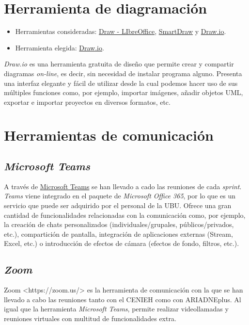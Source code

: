 \section{Herramienta de diagramación}

\begin{itemize}
\tightlist
\item
  Herramientas consideradas:
  \href{https://es.libreoffice.org/descubre/draw/}{Draw - LIbreOffice},
  \href{https://www.smartdraw.com/}{SmartDraw} y
  \href{https://app.diagrams.net/}{Draw.io}.
\item
  Herramienta elegida: \href{https://app.diagrams.net/}{Draw.io}.
\end{itemize}

\emph{Draw.io} es una herramienta gratuita de diseño que permite crear y
compartir diagramas \emph{on-line}, es decir, sin necesidad de instalar
programa alguno. Presenta una interfaz elegante y fácil de utilizar
desde la cual podemos hacer uso de sus múltiples funciones como, por
ejemplo, importar imágenes, añadir objetos UML, exportar e importar
proyectos en diversos formatos, etc.

\section{Herramientas de comunicación}

\subsection{\emph{Microsoft Teams}}

A través de
\href{https://www.microsoft.com/es-es/education/products/teams}{Microsoft
Teams} se han llevado a cado las reuniones de cada \emph{sprint}.
\emph{Teams} viene integrado en el paquete de \emph{Microsoft Office
365}, por lo que es un servicio que puede ser adquirido por el personal
de la UBU. Ofrece una gran cantidad de funcionalidades relacionadas con
la comunicación como, por ejemplo, la creación de chats personalizados
(individuales/grupales, públicos/privados, etc.), compartición de
pantalla, integración de aplicaciones externas (Stream, Excel, etc.) o
introducción de efectos de cámara (efectos de fondo, filtros, etc.).

\subsection{\emph{Zoom}}

{Zoom \textless https://zoom.us/\textgreater{}} es la herramienta de
comunicación con la que se han llevado a cabo las reuniones tanto con el
CENIEH como con ARIADNEplus. Al igual que la herramienta \emph{Microsoft
Teams}, permite realizar videollamadas y reuniones virtuales con
multitud de funcionalidades extra.

